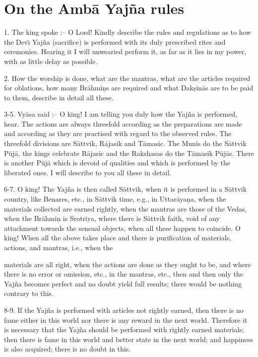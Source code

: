 \chapter{On the Amb\=a Yaj\~na rules}

1. The king spoke :-- O Lord! Kindly describe the rules and regulations as to how the Dev\={\i} Yaj\~na (sacrifice) is performed with its duly prescribed rites and ceremonies. Hearing it I will unwearied perform it, as far as it lies in my power, with as little delay as possible.

2. How the worship is done, what are the mantras, what are the articles required for oblations, how many Br\=ahmi\d{n}s are required and what Dak\d{s}in\=as are to be paid to them, describe in detail all these.

3-5. Vy\=asa said :-- O king! I am telling you duly how the Yaj\~na is performed, hear. The actions are always threefold according as the preparations are made and according as they are practised with regard to the observed rules. The threefold divisions are S\=attvik, R\=ajasik and T\=amasic. The Munis do the S\=attvik P\=uj\=a, the kings celebrate R\=ajasic and the Rakshasas do the T\=amasik P\=uj\=as. There is another P\=uj\=a which is devoid of qualities and which is performed by the liberated ones. I will describe to you all these in detail.

6-7. O king! The Yaj\~na is then called S\=attvik, when it is performed in a S\=attvik country, like Benares, etc., in S\=attvik time, e.g., in Uttar\=aya\d{n}a, when the materials collected are earned rightly, when the mantras are those of the Vedas, when the Br\=ahmi\d{n} is Srotriya, where there is S\=attvik faith, void of any attachment towards the sensual objects, when all these happen to coincide. O king! When all the above takes place and there is purification of materials, actions, and mantras, i.e., when the

materials are all right, when the actions are done as they ought to be, and where there is no error or omission, etc., in the mantras, etc., then and then only the Yaj\~na becomes perfect and no doubt yield full results; there would be nothing contrary to this.

8-9. If the Yaj\~na is performed with articles not rightly earned, then there is no fame either in this world nor there is any reward in the next world. Therefore it is necessary that the Yaj\~na should be performed with rightly earned materials; then there is fame in this world and better state in the next world; and happiness is also acquired; there is no doubt in this.


